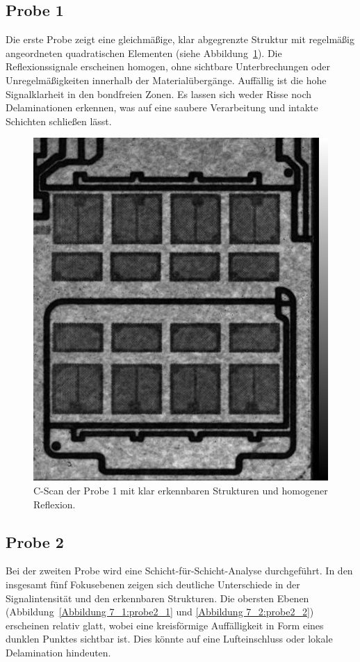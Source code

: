 \subsection{Probe 1}

Die erste Probe zeigt eine gleichmäßige, klar abgegrenzte Struktur mit regelmäßig angeordneten quadratischen Elementen (siehe Abbildung~\ref{Abbildung 6 :probe1}). Die Reflexionssignale erscheinen homogen, ohne sichtbare Unterbrechungen oder Unregelmäßigkeiten innerhalb der Materialübergänge. Auffällig ist die hohe Signalklarheit in den bondfreien Zonen. Es lassen sich weder Risse noch Delaminationen erkennen, was auf eine saubere Verarbeitung und intakte Schichten schließen lässt.
\vspace{0.2cm}
\begin{figure}[htbp]
    \centering
    \includegraphics[scale=0.20]{Bilder/Probe11.jpg}
    \caption{C-Scan der Probe 1 mit klar erkennbaren Strukturen und homogener Reflexion.}
    \label{Abbildung 6 :probe1}
\end{figure}
\vspace{0.5cm}
\subsection{Probe 2}
Bei der zweiten Probe wird eine Schicht-für-Schicht-Analyse durchgeführt. In den insgesamt fünf Fokusebenen zeigen sich deutliche Unterschiede in der Signalintensität und den erkennbaren Strukturen. Die obersten Ebenen (Abbildung~\ref{Abbildung 7_1:probe2_1} und \ref{Abbildung 7_2:probe2_2}) erscheinen relativ glatt, wobei eine kreisförmige Auffälligkeit in Form eines dunklen Punktes sichtbar ist. Dies könnte auf eine Lufteinschluss oder lokale Delamination hindeuten.

